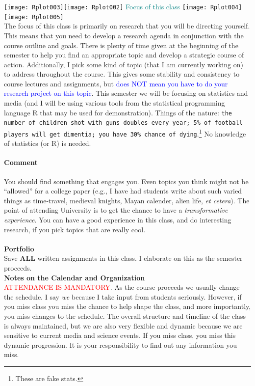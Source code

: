 \documentclass[11pt]{article}
\begin{document}
 \texttt{[image: Rplot003]}\texttt{[image: Rplot002]} \quad \textcolor{teal}{{\sc Focus of this class}} \quad \texttt{[image: Rplot004]}\texttt{[image: Rplot005]}\\ 
       
The focus of this class is primarily on research that you will be directing yourself. This means that you need to develop a research agenda in conjunction with the course outline and goals. There is plenty of time given at the beginning of the semester to help you find an appropriate topic and develop a strategic course of action. Additionally, I pick some kind of topic (that I am currently working on) to address throughout the course. This gives some stability and consistency to course lectures and assignments, but \textcolor{blue}{does NOT mean you have to do your research project on this topic}. This semester we will be focusing on statistics and media (and I will be using various tools from the statistical programming language R that may be used for demonstration). Things of the nature: \texttt{the number of children shot with guns doubles every year; 5\% of football players will get dimentia; you have 30\% chance of dying}.\footnote{These are fake stats.} No knowledge of statistics (or R) is needed.
\paragraph{Comment}  
You should find something that engages you. Even topics you think might not be ``allowed'' for a college paper (e.g., I have had students write about such varied things as time-travel, medieval knights, Mayan calender, alien life, \textsl{et cetera}). The point of attending University is to get the chance to have a \emph{transformative experience}. You can have a good experience in this class, and do interesting research, if you pick topics that are really cool.\\ 
\ \\
 {\bf Portfolio}\\
   Save {\bf ALL} written assignments in this class. I elaborate on this as the semester proceeds.
  \\ 

   {\bf Notes on the Calendar and Organization}\\
   \textcolor{red}{ATTENDANCE IS MANDATORY}. As the course proceeds we usually change the schedule. I say {\it we} because I take input from students seriously. However, if you miss class you miss the chance to help shape the class, and more importantly, you miss changes to the schedule. The overall structure and timeline of the class is always maintained, but we are also very flexible and dynamic because we are sensitive to current media and science events. If you miss class, you miss this dynamic progression. It is your responsibility to find out any information you miss.
   \\ 
       
\end{document}
